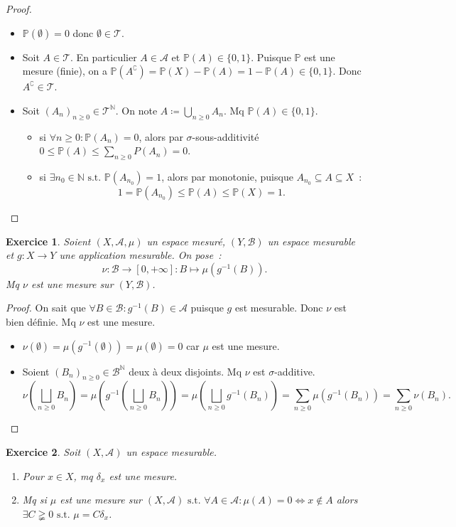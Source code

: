 \documentclass{article}
\newtheorem{ex}{Exercice}[section]
\newcommand{\pinfty}{{+\infty}}
\newcommand{\st}{\text{ s.t. }}
\newcommand{\C}{\complement}
\newcommand{\N}{{\mathbb N}}
\renewcommand{\P}{{\mathbb P}}
\begin{document}
\begin{proof}~
\begin{itemize}
	\item $\P(\emptyset) = 0$ donc $\emptyset \in \mathcal T$.
	\item Soit $A \in \mathcal T$. En particulier $A \in \mathcal A$ et $\P(A) \in \{0, 1\}$. Puisque $\P$ est une mesure (finie), on a
	$\P(A^\C) = \P(X) - \P(A) = 1 - \P(A) \in \{0, 1\}$. Donc $A^\C \in \mathcal T$.
	\item Soit $(A_n)_{n \geq 0} \in \mathcal T^\N$. On note $A \coloneqq \bigcup_{n \geq 0}A_n$. Mq $\P(A) \in \{0, 1\}$.
	\begin{itemize}
		\item si $\forall n \geq 0 : \P(A_n) = 0$, alors par $\sigma$-sous-additivité $0 \leq \P(A) \leq \sum_{n \geq 0}P(A_n) = 0$.
		\item si $\exists n_0 \in \N \st \P(A_{n_0}) = 1$, alors par monotonie, puisque $A_{n_0} \subseteq A \subseteq X$~:
		\[1 = \P(A_{n_0}) \leq \P(A) \leq \P(X) = 1.\]
	\end{itemize}
\end{itemize}
\end{proof}

\begin{ex} Soient $(X, \mathcal A, \mu)$ un espace mesuré, $(Y, \mathcal B)$ un espace mesurable et $g : X \to Y$ une application mesurable. On pose~:
\[\nu : \mathcal B \to [0, \pinfty] : B \mapsto \mu(g^{-1}(B)).\]
Mq $\nu$ est une mesure sur $(Y, \mathcal B)$.
\end{ex}

\begin{proof} On sait que $\forall B \in \mathcal B : g^{-1}(B) \in \mathcal A$ puisque $g$ est mesurable. Donc $\nu$ est bien définie. Mq $\nu$ est une mesure.
\begin{itemize}
	\item $\nu(\emptyset) = \mu(g^{-1}(\emptyset)) = \mu(\emptyset) = 0$ car $\mu$ est une mesure.
	\item Soient $(B_n)_{n \geq 0} \in \mathcal B^\N$ deux à deux disjoints. Mq $\nu$ est $\sigma$-additive.
	\[\nu\left(\bigsqcup_{n \geq 0}B_n\right) = \mu\left(g^{-1}\left(\bigsqcup_{n \geq 0}B_n\right)\right) = \mu\left(\bigsqcup_{n \geq 0}g^{-1}(B_n)\right)
	  = \sum_{n \geq 0}\mu(g^{-1}(B_n)) = \sum_{n \geq 0}\nu(B_n).\]
\end{itemize}
\end{proof}

\begin{ex} Soit $(X, \mathcal A)$ un espace mesurable.
\begin{enumerate}
	\item Pour $x \in X$, mq $\delta_x$ est une mesure.
	\item Mq si $\mu$ est une mesure sur $(X, \mathcal A) \st \forall A \in \mathcal A : \mu(A) = 0 \iff x \not \in A$ alors $\exists C \gneqq 0 \st \mu = C\delta_x$.
\end{enumerate}
\end{ex}
\end{document}

